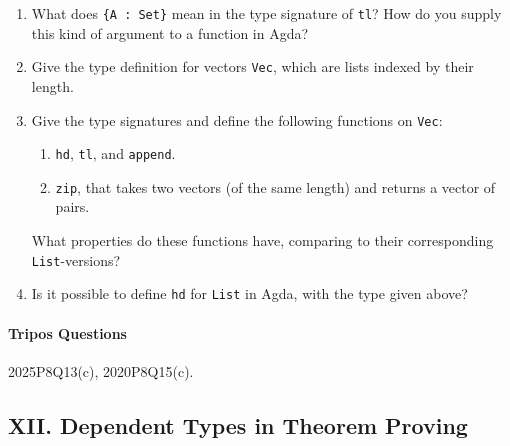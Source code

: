 \documentclass[11pt,a4paper,twoside]{article}
\begin{document}
\begin{enumerate}[label=(\alph*)]
  \item What does \texttt{\{A : Set\}} mean in the type signature of
    \texttt{tl}?
    How do you supply this kind of argument to a function in Agda?

  \item Give the type definition for vectors \texttt{Vec},
    which are lists indexed by their length.

  \item Give the type signatures and define the following functions
    on \texttt{Vec}:
    \begin{enumerate}[label=(\roman*)]
      \item \texttt{hd}, \texttt{tl}, and \texttt{append}.
      \item \texttt{zip}, that takes two vectors (of the same length)
        and returns a vector of pairs.
    \end{enumerate}
    What properties do these functions have, comparing to their
    corresponding \texttt{List}-versions?

  \item Is it possible to define \texttt{hd} for \texttt{List} in Agda,
    with the type given above?
\end{enumerate}

\paragraph{Tripos Questions} 2025P8Q13(c), 2020P8Q15(c).

\subsection*{XII. Dependent Types in Theorem Proving}


\end{document}
